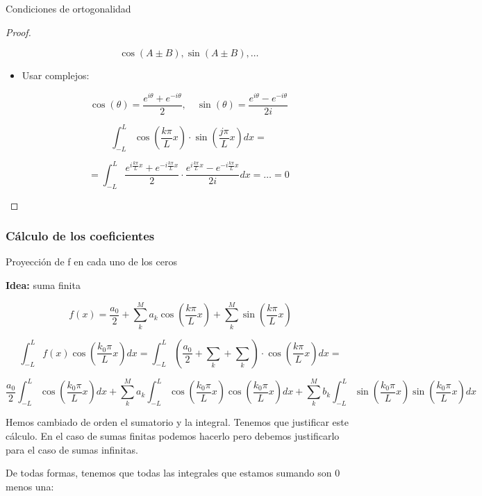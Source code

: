 \begin{theorem}{Condiciones de ortogonalidad}
\begin{proof}
\begin{itemize}
						\[\cos(A ± B), \sin(A ± B), …\]

					\item Usar complejos:

						\[ \cos(\theta) = \frac{e^{i\theta} + e^{-i\theta} }{2}, \quad \sin(\theta) = \frac{e^{i\theta} - e^{-i\theta} }{2i}\]

						\[  \int^{L}_{-L} \cos \left( \frac{k \pi}{L} x \right) \cdot \sin \left( \frac{j \pi}{L} x \right) dx = \]

						\[ = \int^L_{-L} \frac{e^{i\frac{k\pi}{L}x} + e^{-i\frac{k\pi}{L}x} }{2} \cdot \frac{e^{i\frac{k\pi}{L}x} - e^{-i\frac{k\pi}{L}x} }{2i} dx = … = 0 \]

				\end{itemize}

			\end{proof}

		\end{theorem}



	\subsubsection{Cálculo de los coeficientes}

		Proyección de f en cada uno de los ceros

		\textbf{Idea:} suma finita

		\[ f(x) = \frac{a_0}{2}+ \sum_k^M a_k \cos \left( \frac{k \pi}{L} x \right) + \sum_k^M \sin \left( \frac{k \pi}{L} x \right)\]

		\[ \int^L_{-L} f(x) \cos \left( \frac{k_0 \pi}{L} x \right) dx = \int^L_{-L} (\frac{a_0}{2} + \sum_k + \sum_k ) \cdot  \cos \left( \frac{k \pi}{L} x \right) dx  = \]

		\[ \frac{a_0}{2}  \int^L_{-L} \cos \left( \frac{k_0 \pi}{L} x \right) dx + \sum_k^M a_k \int^L_{-L} \cos \left( \frac{k_0 \pi}{L} x \right) \cos \left( \frac{k_0 \pi}{L} x \right) dx + \sum_k^M b_k \int^L_{-L} \sin \left( \frac{k_0 \pi}{L} x \right) \sin \left( \frac{k_0 \pi}{L} x \right) dx \]

		Hemos cambiado de orden el sumatorio y la integral. Tenemos que justificar este cálculo. En el caso de sumas finitas podemos hacerlo pero debemos justificarlo para el caso de sumas infinitas.


		De todas formas, tenemos que todas las integrales que estamos sumando son 0 menos una:

